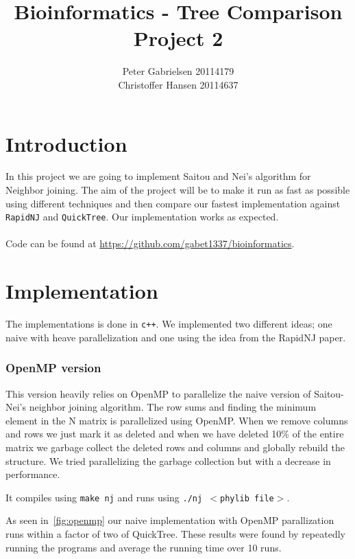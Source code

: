 \documentclass[a4paper,oneside,article,11pt]{memoir}
\title{Bioinformatics - Tree Comparison \\ Project 2}
\author{Peter Gabrielsen 20114179\\
Christoffer Hansen 20114637}
\begin{document}
\maketitle

\chapter*{Introduction}
In this project we are going to implement Saitou and Nei's algorithm for Neighbor joining. The aim of the project will be to make it run as fast as possible using different techniques and then compare our fastest implementation against \texttt{RapidNJ} and \texttt{QuickTree}.
Our implementation works as expected.
\\\\Code can be found at \url{https://github.com/gabet1337/bioinformatics}.

\pagebreak

\chapter*{Implementation}
The implementations is done in \texttt{c++}. 
We implemented two different ideas; one naive with heave parallelization and one using the idea from the RapidNJ paper.

\subsection*{OpenMP version}
This version heavily relies on OpenMP to parallelize the naive version of Saitou-Nei's neighbor joining algorithm. The row sums and finding the minimum element in the N matrix is parallelized using OpenMP. When we remove columns and rows we just mark it as deleted and when we have deleted 10\% of the entire matrix we garbage collect the deleted rows and columns and globally rebuild the structure. We tried parallelizing the garbage collection but with a decrease in performance.

It compiles using \texttt{make nj} and runs using \texttt{./nj $<$phylib file$>$}.

As seen in~\ref{fig:openmp} our naive implementation with OpenMP parallization runs within a factor of two of QuickTree. These results were found by repeatedly running the programs and average the running time over 10 runs.
\end{document}
